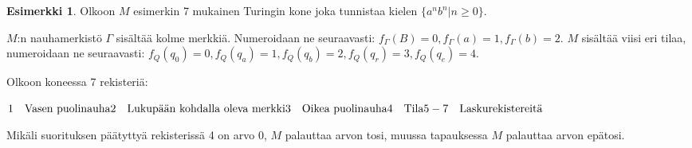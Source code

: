 \documentclass[a4paper, 12pt]{article}
\theoremstyle{definition}
\newtheorem{example}[mydef]{Esimerkki}
\theoremstyle{plain}
\begin{document}
\begin{example}
Olkoon $M$ esimerkin 7 mukainen Turingin kone joka tunnistaa kielen $\{a^nb^n | n \geq 0\}$.

$M$:n nauhamerkistö $\Gamma$ sisältää kolme merkkiä. Numeroidaan ne seuraavasti: $f_\Gamma(B) = 0, f_\Gamma(a) = 1, f_\Gamma(b) = 2$. $M$ sisältää viisi eri tilaa, numeroidaan ne seuraavasti: $f_Q(q_0) = 0, f_Q(q_a) = 1, f_Q(q_b) = 2, f_Q(q_r) = 3, f_Q(q_e) = 4$.

Olkoon koneessa 7 rekisteriä:

\begin{math} \\
1\quad \text{Vasen puolinauha} \\
2\quad \text{Lukupään kohdalla oleva merkki}\\
3\quad \text{Oikea puolinauha}\\
4\quad \text{Tila}\\
5-7\quad \text{Laskurekistereitä}\\
\end{math}

Mikäli suorituksen päätyttyä rekisterissä 4 on arvo 0, $M$ palauttaa arvon tosi, muussa tapauksessa $M$ palauttaa arvon epätosi.


\end{example}
\end{document}
